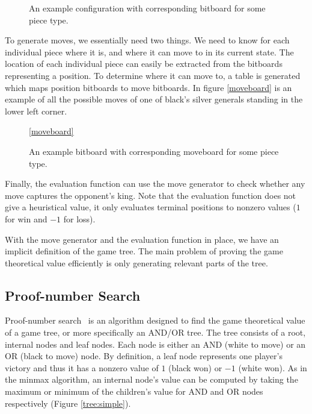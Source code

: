 \documentclass{article}
\begin{document}
\begin{figure}[h]
\center
\caption{An example configuration with corresponding bitboard for some piece type.}
\label{bitboard}
\end{figure}

To generate moves, we essentially need two things. We need to know for each individual piece where it is, and where it can move to in its current state.
The location of each individual piece can easily be extracted from the bitboards representing a position. To determine where it can move to, a table
is generated which maps position bitboards to move bitboards. In figure \ref{moveboard} is an example of all the possible moves of one of black's silver
generals standing in the lower left corner.

\begin{figure}[h]
\center
\caption{An example bitboard with corresponding moveboard for some piece type.}
\ref{moveboard}
\end{figure}

Finally, the evaluation function can use the move generator to check whether any move captures the opponent's king. Note that the evaluation function
does not give a heuristical value, it only evaluates terminal positions to nonzero values ($1$ for win and $-1$ for loss).

With the move generator and the evaluation function in place, we have an implicit definition of the game tree. The main problem of proving the game
theoretical value efficiently is only generating relevant parts of the tree.

\subsection{Proof-number Search}
Proof-number search~\cite{allis1994proof} is an algorithm designed to find the game theoretical value of a game tree, or more specifically an AND/OR tree.
The tree consists of a root, internal nodes and leaf nodes. Each node is either an AND (white to move) or an OR (black to move) node. By definition, a leaf
node represents one player's victory and thus it has a nonzero value of $1$ (black won) or $-1$ (white won). As in the minmax algorithm, an internal
node's value can be computed by taking the maximum or minimum of the children's value for AND and OR nodes respectively (Figure \ref{tree:simple}).
\end{document}
